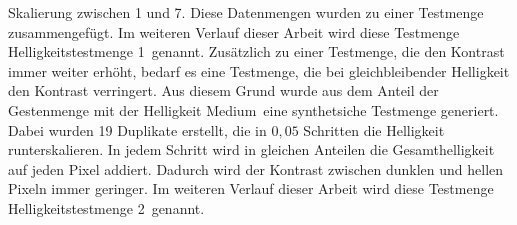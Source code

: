 Skalierung zwischen 1 und 7. Diese Datenmengen wurden zu einer Testmenge zusammengefügt. Im weiteren Verlauf dieser Arbeit wird diese Testmenge \glqq Helligkeitstestmenge 1\grqq\ genannt.
\newline
\newline
Zusätzlich zu einer Testmenge, die den Kontrast immer weiter erhöht, bedarf es eine Testmenge, die bei gleichbleibender Helligkeit den Kontrast verringert. Aus diesem Grund wurde aus dem Anteil der Gestenmenge mit
der Helligkeit \glqq Medium\grqq\ eine synthetsiche Testmenge generiert. Dabei wurden 19 Duplikate erstellt, die in $0,05$ Schritten die Helligkeit runterskalieren. In jedem Schritt wird in gleichen
Anteilen die Gesamthelligkeit auf jeden Pixel addiert. Dadurch wird der Kontrast zwischen dunklen und hellen Pixeln immer geringer. Im weiteren Verlauf dieser Arbeit wird diese Testmenge
\glqq Helligkeitstestmenge 2\grqq\ genannt.